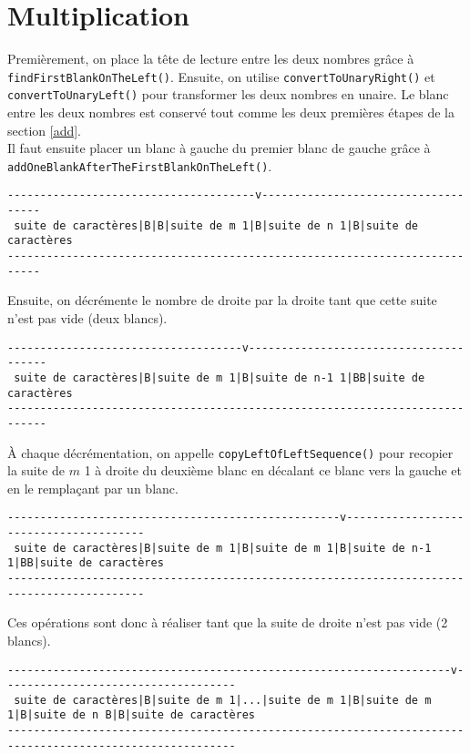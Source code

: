 \documentclass[a4paper,11pt]{article}
\begin{document}
\section{Multiplication}
Premièrement, on place la tête de lecture entre les deux nombres grâce à \texttt{findFirstBlankOn\-The\-Left()}.
Ensuite, on utilise \texttt{convertToUnaryRight()} et \texttt{convertToUnaryLeft()} pour transformer les deux nombres en unaire. Le blanc entre les deux nombres est conservé tout comme les deux premières étapes de la section \ref{add}.\\
Il faut ensuite placer un blanc à gauche du premier blanc de gauche grâce à \texttt{addOneBlankAfter\-The\-First\-BlankOnTheLeft()}.
\begin{verbatim}
--------------------------------------v------------------------------------
 suite de caractères|B|B|suite de m 1|B|suite de n 1|B|suite de caractères
---------------------------------------------------------------------------
\end{verbatim}
Ensuite, on décrémente le nombre de droite par la droite tant que cette suite n'est pas vide (deux blancs).
\begin{verbatim}
------------------------------------v---------------------------------------
 suite de caractères|B|suite de m 1|B|suite de n-1 1|BB|suite de caractères
----------------------------------------------------------------------------
\end{verbatim}
À chaque décrémentation, on appelle \texttt{copyLeftOfLeftSequence()} pour recopier la suite de $m$ 1 à droite du deuxième blanc en décalant ce blanc vers la gauche et en le remplaçant par un blanc.
\begin{footnotesize}
\begin{verbatim}
---------------------------------------------------v---------------------------------------
 suite de caractères|B|suite de m 1|B|suite de m 1|B|suite de n-1 1|BB|suite de caractères
-------------------------------------------------------------------------------------------
\end{verbatim}
\end{footnotesize}
Ces opérations sont donc à réaliser tant que la suite de droite n'est pas vide (2 blancs).
\begin{scriptsize}
\begin{verbatim}
--------------------------------------------------------------------v------------------------------------
 suite de caractères|B|suite de m 1|...|suite de m 1|B|suite de m 1|B|suite de n B|B|suite de caractères
---------------------------------------------------------------------------------------------------------
\end{verbatim}
\end{scriptsize}
\end{document}
